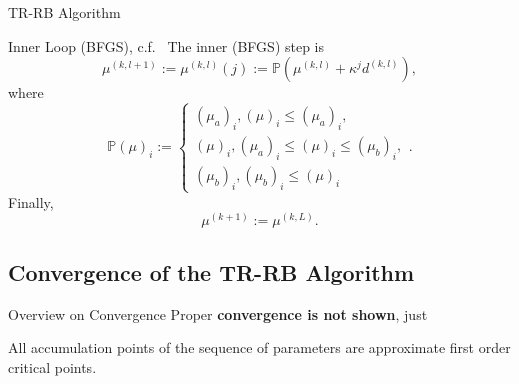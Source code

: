 \begin{frame}{TR-RB Algorithm}
    \begin{block}{Inner Loop (BFGS), c.f.~\cite{Qian2017, Keil2021}}
        The inner (BFGS) step is
        \begin{equation*}
            \mu^{(k, l + 1)} := \mu^{(k, l)}(j) := \mathbb{P}(\mu^{(k, l)} + \kappa^j d^{(k, l)}),
        \end{equation*}
        where
        \begin{equation*}
            {\mathbb{P}(\mu)}_i := \begin{cases}
                {(\mu_a)}_i, {(\mu)}_i \leq {(\mu_a)}_i, \\
                {(\mu)}_i, {(\mu_a)}_i \leq {(\mu)}_i \leq {(\mu_b)}_i, \\
                {(\mu_b)}_i, {(\mu_b)}_i \leq {(\mu)}_i
            \end{cases}.
        \end{equation*}
        Finally,
        \begin{equation*}
            \mu^{(k + 1)} := \mu^{(k, L)}.
        \end{equation*}
    \end{block}
\end{frame}

\subsection{Convergence of the TR-RB Algorithm}

\begin{frame}{Overview on Convergence}
    Proper \textbf{convergence is not shown}, just
    \begin{block}{}
        All accumulation points of the sequence of parameters are approximate first order critical points.
    \end{block}
\end{frame}